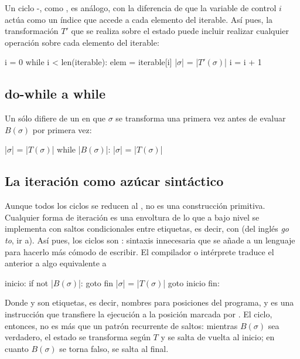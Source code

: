 Un ciclo -, como , es análogo, con la diferencia de que la variable de control \(i\) actúa como un índice que accede a cada elemento del iterable. Así pues, la transformación \(T'\) que se realiza sobre el estado puede incluir realizar cualquier operación sobre cada elemento del iterable:
\begin{pseudocode}
i = 0
while i < len(iterable):
    elem = iterable[i]
    |\(\sigma\)| = |\(T'(\sigma)\)|
    i = i + 1
\end{pseudocode}

\subsection{do-while a while}

Un  sólo difiere de un  en que \(\sigma\) se transforma una primera vez antes de evaluar \(B(\sigma)\) por primera vez:
\begin{pseudocode}
|\(\sigma\)| = |\(T(\sigma)\)|
while |\(B(\sigma)\)|:
    |\(\sigma\)| = |\(T(\sigma)\)|
\end{pseudocode}

\subsection{La iteración como azúcar sintáctico}

Aunque todos los ciclos se reducen al , no es una construcción primitiva. Cualquier forma de iteración es una envoltura de lo que a bajo nivel se implementa con saltos condicionales entre etiquetas, es decir, con  (del inglés \textit{go to}, ir a). Así pues, los ciclos son : sintaxis innecesaria que se añade a un lenguaje para hacerlo más cómodo de escribir. El compilador o intérprete traduce el  anterior a algo equivalente a
\begin{pseudocode}
inicio:
    if not |\(B(\sigma)\)|:
        goto fin
    |\(\sigma\)| = |\(T(\sigma)\)|
    goto inicio
fin:
\end{pseudocode}
Donde  y  son etiquetas, es decir, nombres para posiciones del programa, y  es una instrucción que transfiere la ejecución a la posición marcada por . El ciclo, entonces, no es más que un patrón recurrente de saltos: mientras \(B(\sigma)\) sea verdadero, el estado se transforma según \(T\) y se salta de vuelta al inicio; en cuanto \(B(\sigma)\) se torna falso, se salta al final.

